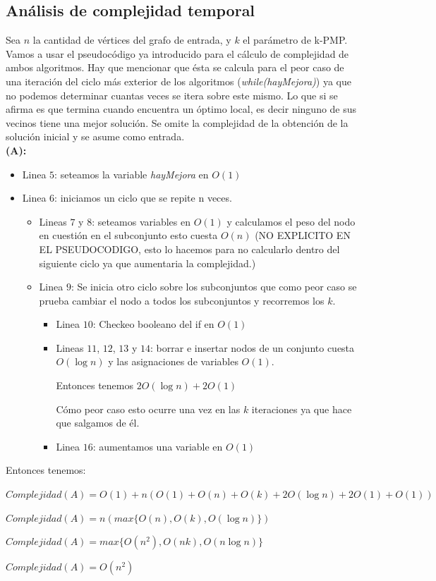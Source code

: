 \subsection{Análisis de complejidad temporal}
Sea $n$ la cantidad de vértices del grafo de entrada, y $k$ el parámetro de k-PMP. Vamos a usar el pseudocódigo ya introducido para el cálculo de complejidad de ambos algoritmos. Hay que mencionar que ésta se calcula para el peor caso de una iteración del ciclo más exterior de los algoritmos (\textit{while(hayMejora)}) ya que no podemos determinar cuantas veces se itera sobre este mismo. Lo que si se afirma es que termina cuando encuentra un óptimo local, es decir ninguno de sus vecinos tiene una mejor solución. Se omite la complejidad de la obtención de la solución inicial y se asume como entrada.
\\

\textbf{(A):}

\begin{itemize}
    \item Linea $5$: seteamos la variable \textit{hayMejora} en $O(1)$
    \item Linea $6$: iniciamos un ciclo que se repite n veces.
    \begin{itemize}
        \item Lineas $7$ y $8$: seteamos variables en $O(1)$ y calculamos el peso del nodo en cuestión en el subconjunto esto cuesta $O(n)$ (NO EXPLICITO EN EL PSEUDOCODIGO, esto lo hacemos para no calcularlo dentro del siguiente ciclo ya que aumentaria la complejidad.)
        \item Linea $9$: Se inicia otro ciclo sobre los subconjuntos que como peor caso se prueba cambiar el nodo a todos los subconjuntos y recorremos los $k$.
        \begin{itemize}
            \item Linea $10$: Checkeo booleano del if en $O(1)$
            \item Lineas $11$, $12$, $13$ y $14$: borrar e insertar nodos de un conjunto cuesta $O(\log n)$ y las asignaciones de variables $O(1)$. 

            Entonces tenemos $2O(\log n) + 2O(1)$

            Cómo peor caso esto ocurre una vez en las $k$ iteraciones ya que hace que salgamos de él.
            \item Linea $16$: aumentamos una variable en $O(1)$
        \end{itemize}
    \end{itemize}
\end{itemize}
Entonces tenemos:
\begin{center}
    $Complejidad(A) = O(1) + n(O(1)+O(n)+O(k)+2O(\log n)+2O(1)+O(1))$

    $Complejidad(A) = n(max\{O(n),O(k),O(\log n)\})$

    $Complejidad(A) = max\{O(n^2),O(nk),O(n\log n)\}$

    $Complejidad(A) = O(n^2)$
\end{center}

